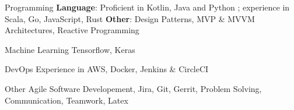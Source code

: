 

\begin{cvskills}

  \cvskill
    {Programming} %
    {\textbf{Language}: Proficient in Kotlin, Java and Python ; experience in Scala, Go, JavaScript, Rust \linebreak \textbf{Other}: Design Patterns, MVP \& MVVM Architectures, Reactive Programming} %


  \cvskill
    {Machine Learning} %
  { Tensorflow, Keras} %

  \cvskill
    {DevOps} %
    {Experience in AWS, Docker, Jenkins \& CircleCI} %


  \cvskill
    {Other} %
    { Agile Software Developement, Jira, Git, Gerrit, Problem Solving, Communication, Teamwork, Latex} %


\end{cvskills}